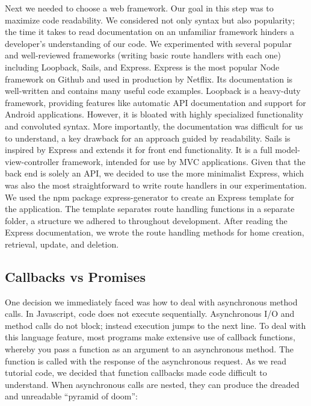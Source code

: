 \documentclass[pageno]{jpaper}
\begin{document}
Next we needed to choose a web framework. Our goal in this step was to maximize code readability. We considered not only syntax but also popularity; the time it takes to read documentation on an unfamiliar framework hinders a developer's understanding of our code. We experimented with several popular and well-reviewed frameworks (writing basic route handlers with each one) including Loopback, Sails, and Express. Express is the most popular Node framework on Github and used in production by Netflix. Its documentation is well-written and contains many useful code examples. Loopback is a heavy-duty framework, providing features like automatic API documentation and support for Android applications. However, it is bloated with highly specialized functionality and convoluted syntax. More importantly, the documentation was difficult for us to understand, a key drawback for an approach guided by readability. Sails is inspired by Express and extends it for front end functionality. It is a full model-view-controller framework, intended for use by MVC applications. Given that the back end is solely an API, we decided to use the more minimalist Express, which was also the most straightforward to write route handlers in our experimentation. We used the npm package express-generator to create an Express template for the application. The template separates route handling functions in a separate folder, a structure we adhered to throughout development. After reading the Express documentation, we wrote the route handling methods for home creation, retrieval, update, and deletion.

\subsection{Callbacks vs Promises}
One decision we immediately faced was how to deal with asynchronous method calls. In Javascript, code does not execute sequentially. Asynchronous I/O and method calls do not block; instead execution jumps to the next line. To deal with this language feature, most programs make extensive use of callback functions, whereby you pass a function as an argument to an asynchronous method. The function is called with the response of the asynchronous request. As we read tutorial code, we decided that function callbacks made code difficult to understand. When asynchronous calls are nested, they can produce the dreaded and unreadable ``pyramid of doom'':
\end{document}
